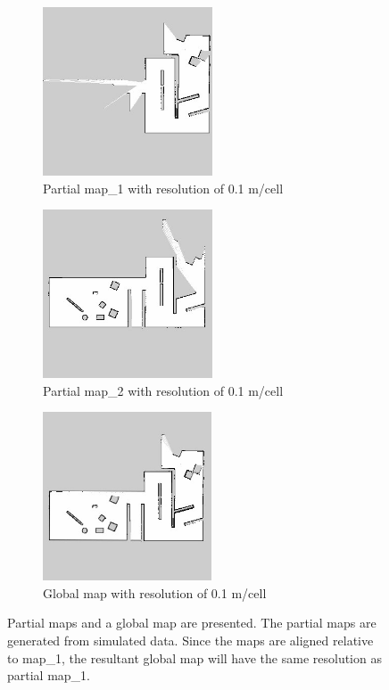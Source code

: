 \begin{figure}[H]
\begin{subfigure}{0.5\textwidth}
\includegraphics[width=0.9\linewidth, height=5cm]{figs/simulation_results/a/partial_map_1.jpg} 
\caption{Partial map\_1 with resolution of 0.1 m/cell}
\label{fig:sim11}
\end{subfigure}
\begin{subfigure}{0.5\textwidth}
\includegraphics[width=0.9\linewidth, height=5cm]{figs/simulation_results/a/partial_map_2.jpg} 
\caption{Partial map\_2 with resolution of 0.1 m/cell}
\label{fig:sim12}
\end{subfigure}
\begin{subfigure}{0.5\textwidth}
\centering
\includegraphics[width=0.9\linewidth, height=5cm]{figs/simulation_results/a/final_map.jpg} 
\caption{Global map with resolution of 0.1 m/cell}
\label{fig:sim13}
\end{subfigure}
\caption{Partial maps and a global map are presented. The partial maps are generated from simulated data. Since the maps are aligned relative to map\_1, the resultant global map will have the same resolution as partial map\_1.}
\label{fig:sim1}
\end{figure}

